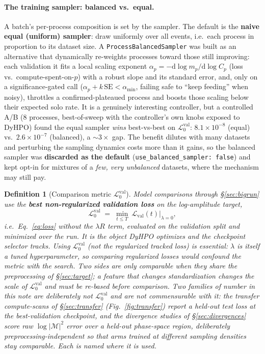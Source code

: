 \documentclass[11pt]{article}
\newcommand{\abs}[1]{\left\lvert #1 \right\rvert}
\newcommand{\Mamp}{\mathcal{M}}
\newcommand{\amp}{\abs{\Mamp}^2}
\newcommand{\Lloss}{\mathcal{L}}
\newcommand{\vlnr}{\mathcal{L}^{\mathrm{val}}_{0}}   %
\newcommand{\code}[1]{\texttt{#1}}
\newtheorem{definition}{Definition}
\begin{document}
\paragraph{The training sampler: balanced vs.\ equal.} A batch's per-process composition is set
by the sampler. The default is the \textbf{naive equal (uniform) sampler}: draw uniformly over
all events, i.e.\ each process in proportion to its dataset size. A \code{ProcessBalancedSampler}
was built as an alternative that dynamically re-weights processes toward those still improving:
each validation it fits a local scaling exponent $\alpha_p=-\mathrm{d}\log m_p/\mathrm{d}\log
C_p$ (loss vs.\ compute-spent-on-$p$) with a robust slope and its standard error, and, only on
a significance-gated call ($\alpha_p+k\,\mathrm{SE}<\alpha_{\min}$, failing safe to ``keep
feeding'' when noisy), throttles a confirmed-plateaued process and boosts those scaling below
their expected solo rate. It is a genuinely interesting controller, but a controlled A/B (8
processes, best-of-sweep with the controller's own knobs exposed to DyHPO) found the equal
sampler \emph{wins} best-vs-best on $\vlnr$: $8.1\times10^{-8}$ (equal) vs.\ $2.6\times10^{-7}$
(balanced), a $\sim\!3\times$ gap. The benefit dilutes with many datasets and perturbing the
sampling dynamics costs more than it gains, so the balanced sampler was \textbf{discarded as the
default} (\code{use\_balanced\_sampler: false}) and kept opt-in for mixtures of a \emph{few, very
unbalanced} datasets, where the mechanism may still pay.

\begin{definition}[Comparison metric $\vlnr$]\label{def:metric}
Model comparisons through \S\ref{sec:bigrun} use the \textbf{best non-regularized validation loss}
on the log-amplitude target,
\begin{equation}
  \vlnr \;=\; \min_{t\le T}\ \Lloss_{\text{val}}(t)\big|_{\lambda=0},
  \label{eq:vlnr}
\end{equation}
i.e.\ Eq.~\eqref{eq:loss} \emph{without} the $\lambda R$ term, evaluated on the validation
split and minimized over the run. It is the object DyHPO optimizes and the checkpoint
selector tracks. Using $\vlnr$ (not the regularized tracked loss) is essential: $\lambda$
is itself a tuned hyperparameter, so comparing regularized losses would confound the metric
with the search. Two sides are only comparable when they share the preprocessing of
\S\ref{sec:target}; a feature that changes standardization changes the scale of $\vlnr$
and must be re-based before comparison. Two families of number in this note are deliberately
\emph{not} $\vlnr$ and are not commensurable with it: the transfer compute-scans of
\S\ref{sec:transfer} (Fig.~\ref{fig:transfer}) report a held-out \emph{test} loss at the
best-validation checkpoint, and
the divergence studies of \S\ref{sec:divergences} score raw $\log\amp$ error over a held-out
phase-space \emph{region}, deliberately preprocessing-independent so that arms trained at
different sampling densities stay comparable. Each is named where it is used.
\end{definition}
\end{document}
